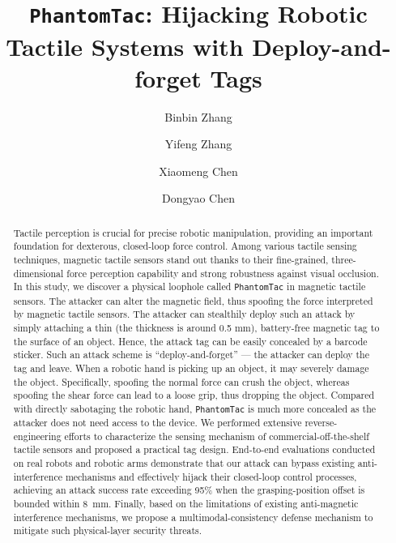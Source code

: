 \documentclass[sigconf]{acmart}
\newcommand{\name}{\texttt{PhantomTac}}
\begin{document}
\title{{\name}: Hijacking Robotic Tactile Systems with Deploy-and-forget Tags}

\author{Binbin Zhang}

\author{Yifeng Zhang}

\author{Xiaomeng Chen}

\author{Dongyao Chen}

\begin{abstract}
Tactile perception is crucial for precise robotic manipulation, providing an important foundation for dexterous, closed-loop force control. 
Among various tactile sensing techniques, magnetic tactile sensors stand out thanks to their fine-grained, three-dimensional force perception capability and strong robustness against visual occlusion. 
In this study, we discover a physical loophole called {\name} in magnetic tactile sensors. 
The attacker can alter the magnetic field, thus spoofing the force interpreted by magnetic tactile sensors.
The attacker can stealthily deploy such an attack by simply attaching a thin (the thickness is around 0.5 mm), battery-free magnetic tag to the surface of an object.
Hence, the attack tag can be easily concealed by a barcode sticker.
Such an attack scheme is ``deploy-and-forget'' --- the attacker can deploy the tag and leave.
When a robotic hand is picking up an object, it may severely damage the object.
Specifically, spoofing the normal force can crush the object, whereas spoofing the shear force can lead to a loose grip, thus dropping the object.
Compared with directly sabotaging the robotic hand, {\name} is much more concealed as the attacker does not need access to the device.
We performed extensive reverse-engineering efforts to characterize the sensing mechanism of commercial-off-the-shelf tactile sensors and proposed a practical tag design. 
End-to-end evaluations conducted on real robots and robotic arms demonstrate that our attack can bypass existing anti-interference mechanisms and effectively hijack their closed-loop control processes, achieving an attack success rate exceeding 95\% when the grasping-position offset is bounded within 8~mm.
Finally, based on the limitations of existing anti-magnetic interference mechanisms, we propose a multimodal-consistency defense mechanism to mitigate such physical-layer security threats.
\end{abstract}
\end{document}

